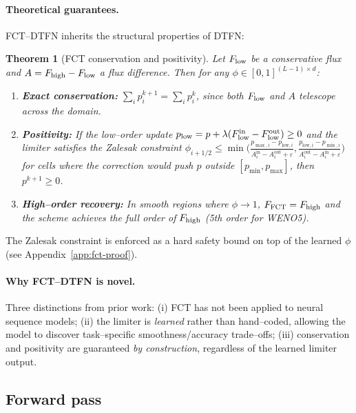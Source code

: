 \documentclass[10pt]{article}
\newtheorem{theorem}{Theorem}
\theoremstyle{definition}
\theoremstyle{remark}
\begin{document}
\paragraph{Theoretical guarantees.}
FCT--DTFN inherits the structural properties of DTFN:
\begin{theorem}[FCT conservation and positivity]
  \label{thm:fct}
  Let $F_{\mathrm{low}}$ be a conservative flux and $A = F_{\mathrm{high}} - F_{\mathrm{low}}$ a flux
  difference.  Then for any $\phi \in [0,1]^{(L-1)\times d}$:
  \begin{enumerate}
    \item[(a)] \textbf{Exact conservation:}
      $\sum_i p^{k+1}_i = \sum_i p^k_i$, since both $F_{\mathrm{low}}$ and $A$
      telescope across the domain.
    \item[(b)] \textbf{Positivity:} If the low--order update
      $p_{\mathrm{low}} = p + \lambda(F_{\mathrm{low}}^{\mathrm{in}} -
      F_{\mathrm{low}}^{\mathrm{out}}) \ge 0$ and the limiter satisfies the
      Zalesak constraint
      $\phi_{i+1/2} \le \min\!\bigl(
        \frac{p_{\max,i} - p_{\mathrm{low},i}}{A^{\mathrm{in}}_i - A^{\mathrm{out}}_i + \varepsilon},
        \frac{p_{\mathrm{low},i} - p_{\min,i}}{A^{\mathrm{out}}_i - A^{\mathrm{in}}_i + \varepsilon}
      \bigr)$
      for cells where the correction would push $p$ outside
      $[p_{\min}, p_{\max}]$, then $p^{k+1} \ge 0$.
    \item[(c)] \textbf{High--order recovery:} In smooth regions where
      $\phi \to 1$, $F_{\mathrm{FCT}} = F_{\mathrm{high}}$ and the scheme
      achieves the full order of $F_{\mathrm{high}}$ (5th order for WENO5).
  \end{enumerate}
\end{theorem}
The Zalesak constraint is enforced as a hard safety bound on top of
the learned $\phi$ (see Appendix~\ref{app:fct-proof}).

\paragraph{Why FCT--DTFN is novel.}
Three distinctions from prior work: (i) FCT has not been applied to
neural sequence models; (ii) the limiter is \emph{learned} rather than
hand--coded, allowing the model to discover task--specific
smoothness/accuracy trade--offs; (iii) conservation and positivity are
guaranteed \emph{by construction}, regardless of the learned limiter
output.

\subsection{Forward pass}
\end{document}
